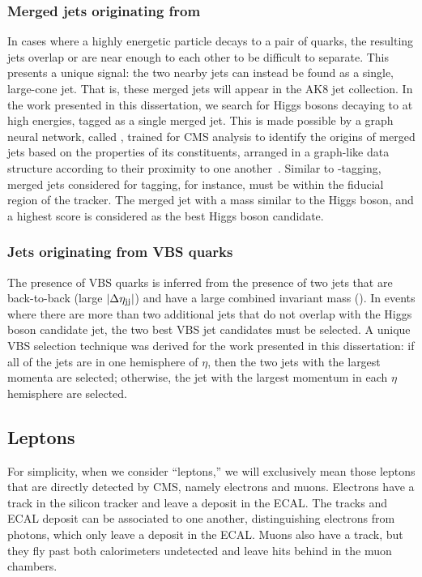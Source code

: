 \subsubsection{Merged jets originating from \Htobb}
In cases where a highly energetic particle decays to a pair of quarks, the resulting jets overlap or are near enough to each other to be difficult to separate. 
This presents a unique signal: the two nearby jets can instead be found as a single, large-cone jet. 
That is, these merged jets will appear in the AK8 jet collection. 
In the work presented in this dissertation, we search for Higgs bosons decaying to \bbbar at high energies, tagged as a single merged jet. 
This is made possible by a graph neural network, called \ParticleNet, trained for CMS analysis to identify the origins of merged jets based on the properties of its constituents, arranged in a graph-like data structure according to their proximity to one another~\cite{Qu:2019gqs}. 
Similar to \Pb-tagging, merged jets considered for \Xtobb tagging, for instance, must be within the fiducial region of the tracker. 
The merged jet with a mass similar to the Higgs boson, and a highest \ParticleNet \Xtobb score is considered as the best Higgs boson candidate.

\subsubsection{Jets originating from VBS quarks}\label{sec:vbsjets}
The presence of VBS quarks is inferred from the presence of two jets that are back-to-back (large $\lvert \Delta\eta_{\mathrm{j}\mathrm{j}} \rvert$) and have a large combined invariant mass (\Mjj). 
In events where there are more than two additional jets that do not overlap with the Higgs boson candidate jet, the two best VBS jet candidates must be selected. 
A unique VBS selection technique was derived for the work presented in this dissertation: 
if all of the jets are in one hemisphere of $\eta$, then the two jets with the largest momenta are selected; 
otherwise, the jet with the largest momentum in each $\eta$ hemisphere are selected. 

\subsection{Leptons}
For simplicity, when we consider ``leptons,'' we will exclusively mean those leptons that are directly detected by CMS, namely electrons and muons. 
Electrons have a track in the silicon tracker and leave a deposit in the ECAL. 
The tracks and ECAL deposit can be associated to one another, distinguishing electrons from photons, which only leave a deposit in the ECAL. 
Muons also have a track, but they fly past both calorimeters undetected and leave hits behind in the muon chambers. 

